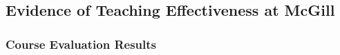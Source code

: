 \documentclass[a4paper,11pt]{article}
\begin{document}


\subsection{Evidence of Teaching Effectiveness at McGill}

\subsubsection{Course Evaluation Results}
\end{document}
